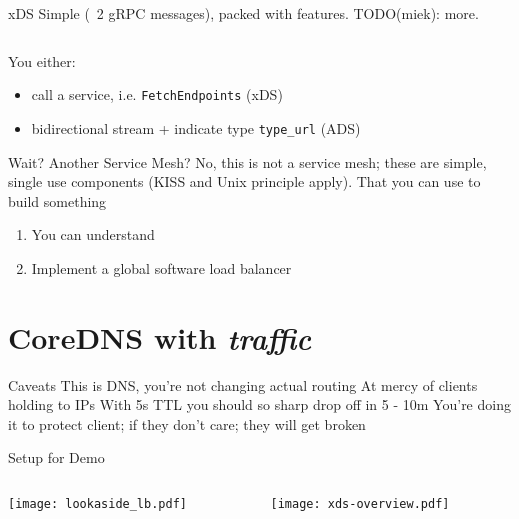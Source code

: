 \documentclass[aspectratio=169]{beamer}
\begin{document}
    \begin{frame}{xDS}
        Simple (~2 gRPC messages), packed with features. TODO(miek): more.
        \begin{columns}[T]
            \begin{column}{0.5\textwidth}
                
            \end{column}
            \begin{column}{0.5\textwidth}
                
            \end{column}
        \end{columns}

        You either:

        \begin{itemize}
            \item call a service, i.e. \texttt{FetchEndpoints} (xDS)
            \item bidirectional stream + indicate type \texttt{type\_url} (ADS)
        \end{itemize}
    \end{frame}

    \begin{frame}{Wait? Another Service Mesh?}
        No, this is not a service mesh; these are simple, single use components (KISS and Unix principle apply). That you can use
        to build something
        \begin{enumerate}
            \item You can understand
            \item Implement a global software load balancer
        \end{enumerate}
    \end{frame}


    \section{CoreDNS with \emph{traffic}}

    \begin{frame}{Caveats}
        This is DNS, you're not changing actual routing
        At mercy of clients holding to IPs
        With 5s TTL you should so sharp drop off in 5 - 10m You're doing it to protect client; if they don't care; they will get broken
    \end{frame}

    \begin{frame}{Setup for Demo}
        \begin{columns}[T]
            \begin{column}{0.2\textwidth}
                \texttt{[image: lookaside\_lb.pdf]}
            \end{column}
            \begin{column}{0.8\textwidth}
                \texttt{[image: xds-overview.pdf]}
            \end{column}
        \end{columns}
    \end{frame}
\end{document}
